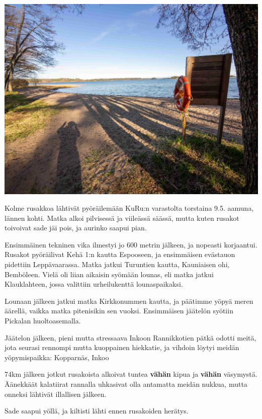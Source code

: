 \documentclass[10pt,finnish,a5paper,twoside=semi]{scrartcl}
\begin{document}
\begin{multicols}{2}
\begin{center}
		\noindent\includegraphics[width=0.94\linewidth]{assets/pyörävaellus5}
	\end{center}

	\columnbreak

	Kolme rusakkoa lähtivät pyöräilemään KuRu:n varastolta torstaina
	9.5. aamuna, lännen kohti. Matka alkoi pilvisessä ja viileässä säässä,
	mutta kuten rusakot toivoivat sade jäi pois, ja aurinko saapui pian.

	Ensimmäinen tekninen vika ilmestyi jo 600 metrin jälkeen, ja nopeasti
	korjaantui. Rusakot pyöräilivat Kehä 1:n kautta Espooseen, ja
	ensimmäisen evästauon pidettiin Leppävaarassa. Matka jatkui Turuntien
	kautta, Kauniaisen ohi, Bemböleen. Vielä oli liian aikaisin syömään
	lounas, eli matka jatkui Klauklahteen, jossa valittiin urheilukenttä
	lounaspaikaksi.

	Lounaan jälkeen jatkui matka \mbox{Kirkkonummen} kautta, ja päätimme yöpyä
	meren äärellä, vaikka matka pitenisikin sen vuoksi.
	Ensimmäisen jäätelön syötiin Pickalan huoltoasemalla.

	Jäätelon jälkeen, pieni mutta stressaava Inkoon Rannikkotien pätkä
	odotti meitä, jota seurasi rennompi mutta kuoppainen hiekkatie, ja
	vihdoin löytyi meidän yöpymispaikka: Kopparnäs, Inkoo

	74km jälkeen jotkut rusakoista alkoivat tuntea \textbf{vähän} kipua ja
	\textbf{vähän} väsymystä. Äänekkäät kalatiirat rannalla uhkasivat olla
	antamatta meidän nukkua, mutta onneksi lähtivät illallisen jälkeen.

	\columnbreak

	Sade saapui yöllä, ja kiltisti lähti ennen rusakoiden herätys.


\end{multicols}
\end{document}
